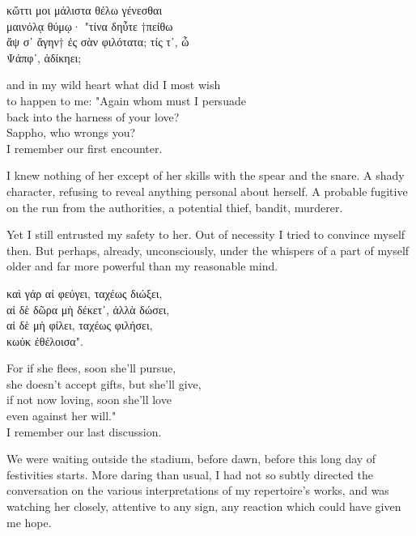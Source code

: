 \documentclass{report}
\begin{document}
\begin{otherlanguage}{greek}
κὤττι μοι μάλιστα θέλω γένεσθαι\\
μαινόλᾳ θύμῳ· "τίνα δηὖτε †πείθω\\
ἄψ σ᾽ ἄγην† ἐς σὰν φιλότατα; τίς τ᾽, ὦ\\
Ψάπφ᾽, ἀδίκηει;
\end{otherlanguage}

and in my wild heart what did I most wish\\
to happen to me: "Again whom must I persuade\\
back into the harness of your love?\\
Sappho, who wrongs you?
\\

I remember our first encounter.

I knew nothing of her except of her skills with the spear and the snare. A shady character, refusing to reveal anything personal about herself. A probable fugitive on the run from the authorities, a potential thief, bandit, murderer.

Yet I still entrusted my safety to her. Out of necessity I tried to convince myself then. But perhaps, already, unconsciously, under the whispers of a part of myself older and far more powerful than my reasonable mind.\\

\begin{otherlanguage}{greek}
καὶ γάρ αἰ φεύγει, ταχέως διώξει,\\
αἰ δὲ δῶρα μὴ δέκετ᾽, ἀλλὰ δώσει,\\
αἰ δὲ μὴ φίλει, ταχέως φιλήσει,\\
κωὐκ ἐθέλοισα".
\end{otherlanguage}

For if she flees, soon she'll pursue,\\
she doesn't accept gifts, but she'll give,\\
if not now loving, soon she'll love\\
even against her will."
\\

I remember our last discussion.

We were waiting outside the stadium, before dawn, before this long day of festivities starts. More daring than usual, I had not so subtly directed the conversation on the various interpretations of my repertoire's works, and was watching her closely, attentive to any sign, any reaction which could have given me hope.
\end{document}
